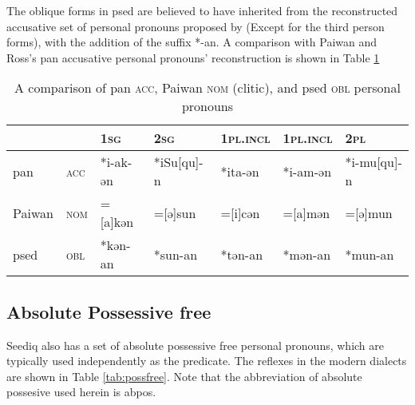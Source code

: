 The oblique forms in \acl{psed} are believed to have inherited from the reconstructed accusative set of personal pronouns proposed by \textcite{ross2006casepronoun} (Except for the third person forms), with the addition of the suffix *-an. A comparison with Paiwan and Ross's \acs{pan} accusative personal pronouns' reconstruction is shown in Table \ref{tab:panacc}

\begin{table}[!htbp]
\centering
\caption{A comparison of \acs{pan} \textsc{acc}, Paiwan \textsc{nom} (clitic), and \acl{psed} \textsc{obl} personal pronouns}
\label{tab:panacc}
\begin{tabular}{lllllll}
\hline
       &     & \textsc{1sg}      & \textsc{2sg}        & \textsc{1pl.incl} & \textsc{1pl.incl} & \textsc{2pl}         \\\hline
\acs{pan}   & \textsc{acc} & *i-ak-ən & *iSu[qu]-n & *ita-ən  & *i-am-ən & *i-mu[qu]-n \\
Paiwan & \textsc{nom} & =[a]kən  & =[ə]sun    & =[i]cən  & =[a]mən  & =[ə]mun     \\
\acl{psed} & \textsc{obl} & *kən-an  & *sun-an    & *tən-an  & *mən-an  & *mun-an    \\ \hline
\end{tabular}
\end{table}

\subsection{Absolute Possessive free}

Seediq also has a set of absolute possessive  free personal pronouns, which are typically used independently as the predicate. The reflexes in the modern dialects are shown in Table \ref{tab:possfree}. Note that the abbreviation of absolute possesive used herein is \acs{abpos}.

